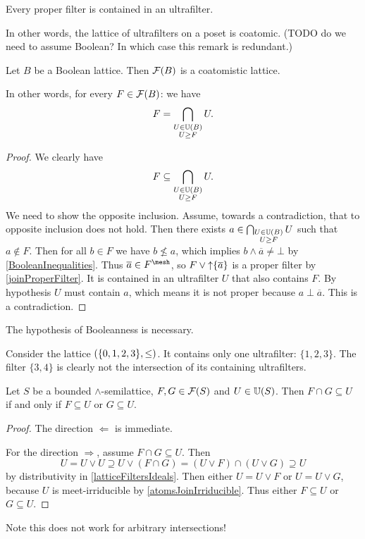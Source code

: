 \begin{proposition} \label{ultrafilterLemma}
Every proper filter is contained in an ultrafilter.
\end{proposition}
In other words, the lattice of ultrafilters on a poset is coatomic. (TODO do we need to assume Boolean? In which case this remark is redundant.)
\begin{corollary} \label{filtersCoatomistic}
Let $B$ be a Boolean lattice. Then $\operatorname{\mathcal{F}}(B)$ is a coatomistic lattice.
\end{corollary}
In other words, for every $F\in \operatorname{\mathcal{F}}(B)$: we have
\[ F = \bigcap_{\substack{U\in \operatorname{\mathbb{U}}(B) \\ U\geq F}} U. \]
\begin{proof}
We clearly have
\[ F \subseteq \bigcap_{\substack{U\in \operatorname{\mathbb{U}}(B) \\ U\geq F}} U. \]
We need to show the opposite inclusion. Assume, towards a contradiction, that to opposite inclusion does not hold. Then there exists $a\in \bigcap_{\substack{U\in \operatorname{\mathbb{U}}(B) \\ U\geq F}} U$ such that $a\notin F$. Then for all $b\in F$ we have $b\not\leq a$, which implies $b\wedge \overline{a} \neq \bot$ by \ref{BooleanInequalities}. Thus $\overline{a} \in F^\mesh$, so $F\vee \operatorname{\uparrow}\{\overline{a}\}$ is a proper filter by \ref{joinProperFilter}. It is contained in an ultrafilter $U$ that also contains $F$. By hypothesis $U$ must contain $a$, which means it is not proper because $a\perp \overline{a}$. This is a contradiction.
\end{proof}
The hypothesis of Booleanness is necessary.
\begin{example}
Consider the lattice $\sSet{\{0,1,2,3\},\leq}$. It contains only one ultrafilter: $\{1,2,3\}$. The filter $\{3,4\}$ is clearly not the intersection of its containing ultrafilters.
\end{example}

\begin{lemma} \label{finiteUltrafilterFactorisation}
Let $S$ be a bounded $\wedge$-semilattice, $F, G\in \operatorname{\mathcal{F}}(S)$ and $U\in\operatorname{\mathbb{U}}(S)$. Then $F\cap G \subseteq U$ \textup{if and only if} $F\subseteq U$ or $G\subseteq U$.
\end{lemma}
\begin{proof}
The direction $\Leftarrow$ is immediate.

For the direction $\Rightarrow$, assume $F\cap G \subseteq U$. Then
\[ U = U\vee U \supseteq U\vee (F\cap G) = (U\vee F)\cap (U\vee G) \supseteq U \]
by distributivity in \ref{latticeFiltersIdeals}. Then either $U = U\vee F$ or $U = U\vee G$, because $U$ is meet-irriducible by \ref{atomsJoinIrriducible}. Thus either $F\subseteq U$ or $G\subseteq U$.
\end{proof}
Note this does not work for arbitrary intersections!

